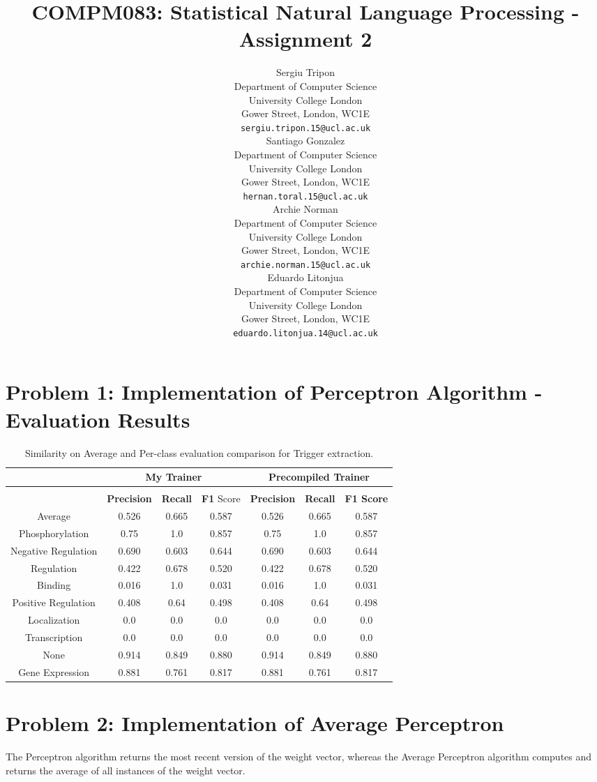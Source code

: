 \documentclass{article} %
\title{COMPM083: Statistical Natural Language Processing - Assignment 2}
\author{
Sergiu Tripon\\
Department of Computer Science\\
University College London\\
Gower Street, London, WC1E\\
\texttt{sergiu.tripon.15@ucl.ac.uk}\\
\And
Santiago Gonzalez\\
Department of Computer Science\\
University College London\\
Gower Street, London, WC1E\\
\texttt{hernan.toral.15@ucl.ac.uk} \\
\AND
Archie Norman \\
Department of Computer Science\\
University College London\\
Gower Street, London, WC1E\\
\texttt{archie.norman.15@ucl.ac.uk} \\
\And
Eduardo Litonjua\\
Department of Computer Science\\
University College London\\
Gower Street, London, WC1E\\
\texttt{eduardo.litonjua.14@ucl.ac.uk} \\
}
\begin{document}
\maketitle

\section*{Problem 1: Implementation of Perceptron Algorithm - Evaluation Results}

\begin{table}[!htbp]
\caption{Similarity on Average and Per-class evaluation comparison for Trigger extraction.}
\label{table:Perceptron}
\begin{center}
\begin{tabular}{c c c c c c c}
\multicolumn{1}{c}{} & \multicolumn{3}{c}{\bf My Trainer}  &\multicolumn{3}{c}{\bf Precompiled Trainer}
\\ \hline \\
{} & \textbf{Precision} & \textbf{Recall} & \textbf{F1} Score & \textbf{Precision} & \textbf{Recall} & \textbf{F1 Score}\\
Average             & 0.526 & 0.665 & 0.587 & 0.526 & 0.665 & 0.587\\
Phosphorylation     & 0.75  & 1.0   & 0.857 & 0.75  & 1.0   & 0.857\\
Negative Regulation & 0.690 & 0.603 & 0.644 & 0.690 & 0.603 & 0.644\\
Regulation          & 0.422 & 0.678 & 0.520 & 0.422 & 0.678 & 0.520\\
Binding             & 0.016 & 1.0   & 0.031 & 0.016 & 1.0   & 0.031\\
Positive Regulation & 0.408 & 0.64  & 0.498 & 0.408 & 0.64  & 0.498\\
Localization        & 0.0   & 0.0   & 0.0   & 0.0   & 0.0   & 0.0\\
Transcription       & 0.0   & 0.0   & 0.0   & 0.0   & 0.0   & 0.0\\
None                & 0.914 & 0.849 & 0.880 & 0.914 & 0.849 & 0.880\\
Gene Expression     & 0.881 & 0.761 & 0.817 & 0.881 & 0.761 & 0.817\\
\end{tabular}
\end{center}
\end{table}

\section*{Problem 2: Implementation of Average Perceptron}
The Perceptron algorithm returns the most recent version of the weight vector, whereas the Average Perceptron algorithm computes and returns the average of all instances of the weight vector\cite{collins2002discriminative}.
\end{document}
